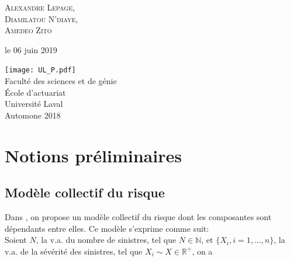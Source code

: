 \documentclass{article}
\begin{document}
\begin{titlepage}
		{\scshape\Large Alexandre Lepage, \\
			Diamilatou N'diaye, \\ Amedeo Zito \\} %
		
		\vspace*{5\baselineskip}
		
		le 06 juin 2019
		
		\vspace{0.5\baselineskip} %
		
		\vfill %
		
		
		\texttt{[image: UL\_P.pdf]}\\
		
		Faculté des sciences et de génie\\
		École d'actuariat\\
		Université Laval\\
		Automone 2018       
		
	\end{titlepage}
	
	\setcounter{page}{0}
	
	\newpage
	\strut %
	\newpage
	
	\tableofcontents	
	\renewcommand{\listfigurename}{Liste des illustrations}
	\listoffigures
	\listoftables
	\newpage
	
	\setcounter{page}{1}
	
	\section{Notions préliminaires}
	\subsection{Modèle collectif du risque}\label{sect_Modele_Collectif}
	
		Dans \cite{Itre5}, on propose un modèle collectif du risque dont les composantes sont dépendants entre elles. Ce modèle s'exprime comme suit: \\
		
		Soient $N$, la v.a. du nombre de sinistres, tel que $N \in \mathbb{N}$, et $\{X_i, i=1, \dots, n\}$, la v.a. de la sévérité des sinistres, tel que $X_i\sim X \in \mathbb{R}^+$, on a
		
\end{document}
